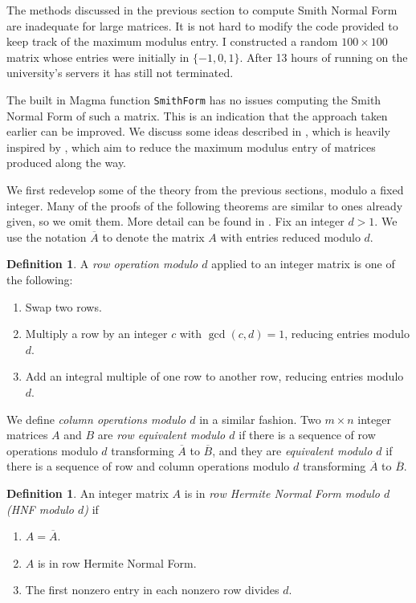\documentclass[12pt,a4paper,answers]{exam}
\theoremstyle{definition}
\newtheorem{definition}[theorem]{Definition}
\begin{document}
The methods discussed in the previous section to compute Smith Normal Form are inadequate for large matrices. It is not hard to modify the code provided to keep track of the maximum modulus entry.  I constructed a random $100\times100$ matrix whose entries were initially in $\{-1,0,1\}$. After 13 hours of running on the university's servers it has still not terminated. 

The built in {\sc Magma} function \texttt{SmithForm} has no issues computing the Smith Normal Form of such a matrix. This is an indication that the approach taken earlier can be improved. We discuss some ideas described in \cite{sims}, which is heavily inspired by \cite{havas}, which aim to reduce the maximum modulus entry of matrices produced along the way.

We first redevelop some of the theory from the previous sections, modulo a fixed integer. Many of the proofs of the following theorems are similar to ones already given, so we omit them. More detail can be found in \cite{sims}. Fix an integer $d>1$. We use the notation $\overline{A}$ to denote the matrix $A$ with entries reduced modulo $d$.

\begin{definition}
  A \emph{row operation modulo $d$} applied to an integer matrix is one of the following:
  \begin{enumerate}
  \item Swap two rows.
  \item Multiply a row by an integer $c$ with $\gcd(c,d)=1$, reducing entries modulo $d$.
  \item Add an integral multiple of one row to another row, reducing entries modulo $d$.
  \end{enumerate}
  We define \emph{column operations modulo $d$} in a similar fashion. Two $m\times n$ integer matrices $A$ and $B$ are \emph{row equivalent modulo $d$} if there is a sequence of row operations modulo $d$ transforming $\overline{A}$ to $\overline{B}$, and they are \emph{equivalent modulo $d$} if there is a sequence of row and column operations modulo $d$ transforming $\overline{A}$ to $\overline{B}$.
\end{definition}

\begin{definition}
  An integer matrix $A$ is in \emph{row Hermite Normal Form modulo $d$ (HNF modulo $d$)} if
  \begin{enumerate}
  \item $A=\overline{A}$.
  \item $A$ is in row Hermite Normal Form.
  \item The first nonzero entry in each nonzero row divides $d$.
  \end{enumerate}
\end{definition}
\end{document}
